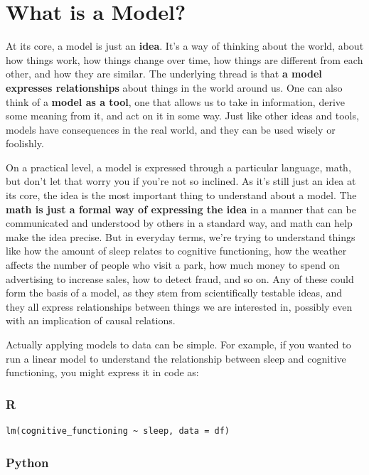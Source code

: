 \documentclass[
  letterpaper,
]{krantz}
\begin{document}
\section{What is a Model?}\label{sec-lm-what-is-a-model}

At its core, a model is just an \textbf{idea}. It's a way of thinking
about the world, about how things work, how things change over time, how
things are different from each other, and how they are similar. The
underlying thread is that \textbf{a model expresses relationships} about
things in the world around us. One can also think of a \textbf{model as
a tool}, one that allows us to take in information, derive some meaning
from it, and act on it in some way. Just like other ideas and tools,
models have consequences in the real world, and they can be used wisely
or foolishly.

On a practical level, a model is expressed through a particular
language, math, but don't let that worry you if you're not so inclined.
As it's still just an idea at its core, the idea is the most important
thing to understand about a model. The \textbf{math is just a formal way
of expressing the idea} in a manner that can be communicated and
understood by others in a standard way, and math can help make the idea
precise. But in everyday terms, we're trying to understand things like
how the amount of sleep relates to cognitive functioning, how the
weather affects the number of people who visit a park, how much money to
spend on advertising to increase sales, how to detect fraud, and so on.
Any of these could form the basis of a model, as they stem from
scientifically testable ideas, and they all express relationships
between things we are interested in, possibly even with an implication
of causal relations.

Actually applying models to data can be simple. For example, if you
wanted to run a linear model to understand the relationship between
sleep and cognitive functioning, you might express it in code as:

\subsubsection{R}

\begin{verbatim}
lm(cognitive_functioning ~ sleep, data = df)
\end{verbatim}

\subsubsection{Python}
\end{document}
